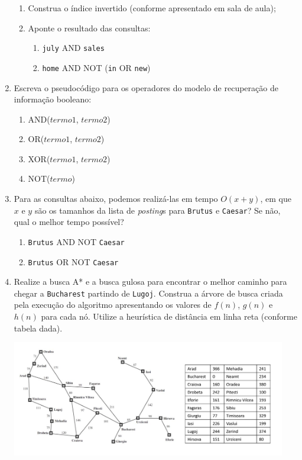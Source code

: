 \documentclass[12pt,a4paper,oneside]{article}
\begin{document}
\begin{enumerate}
	\begin{enumerate}
		\item Construa o índice invertido (conforme apresentado em sala de aula);
		\item Aponte o resultado das consultas:
		\begin{enumerate}
			\item {\tt july} {\sc AND} {\tt sales}
			\item {\tt home} {\sc AND} {\sc NOT} ({\tt in} {\sc OR} {\tt new})
		\end{enumerate}				 
	\end{enumerate}
	
	\item Escreva o pseudocódigo para os operadores do modelo de recuperação de informação booleano:
	\begin{enumerate}
		\item {\sc AND}($termo1$, $termo2$)
		\item {\sc OR}($termo1$, $termo2$)
		\item {\sc XOR}($termo1$, $termo2$)
		\item {\sc NOT}($termo$)
	\end{enumerate}
	
	\item Para as consultas abaixo, podemos realizá-las em tempo $O( x + y )$, em que $x$ e $y$ são os tamanhos da lista de {\it posting}s para {\tt Brutus} e {\tt Caesar}? Se não, qual o melhor tempo possível?
	\begin{enumerate}
		\item {\tt Brutus} {\sc AND NOT} {\tt Caesar}
		\item {\tt Brutus} {\sc OR NOT} {\tt Caesar}
	\end{enumerate}
	
	\item Realize a busca A* e a busca gulosa para encontrar o melhor caminho para chegar a {\tt Bucharest} partindo de {\tt Lugoj}. Construa a árvore de busca criada pela execução do algoritmo apresentando os valores de $f(n)$, $g(n)$ e $h(n)$ para cada nó. Utilize a heurística de distância em linha reta (conforme tabela dada).
	
	\begin{center}
		\includegraphics[width=12cm]{images/fig01.png}
	\end{center}
	

\end{enumerate}
\end{document}
